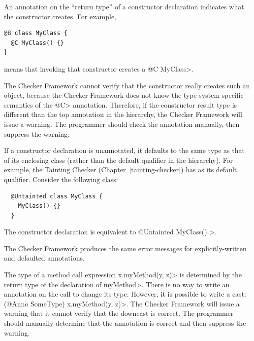 

An annotation on the ``return type'' of a constructor declaration indicates
what the constructor creates.  For example,

\begin{Verbatim}
@B class MyClass {
  @C MyClass() {}
}
\end{Verbatim}

\noindent
means that invoking that constructor creates a \<@C MyClass>.

The Checker Framework cannot verify that the constructor really creates
such an object, because the Checker Framework does not know the
type-system-specific semantics of the \<@C> annotation.
Therefore, if the constructor result type is different than the top annotation in the
hierarchy, the Checker Framework will issue a warning.
The programmer should check the annotation manually, then
suppress the warning.



If a constructor declaration is unannotated, it defaults to the same type as that of
its enclosing class (rather than the default qualifier in the hierarchy).
For example, the Tainting Checker (Chapter~\ref{tainting-checker}) has 
as its default qualifier. Consider the following class:

\begin{Verbatim}
  @Untainted class MyClass {
    MyClass() {}
  }
\end{Verbatim}

\noindent
The constructor declaration is equivalent to \<@Untainted MyClass() \ttlcb\ttrcb>.

The Checker Framework produces the same error messages for
explicitly-written and defaulted annotations.



The type of a method call expression \<x.myMethod(y, z)> is determined by
the return type of the declaration of \<myMethod>.  There is no way to
write an annotation on the call to change its type.  However, it is
possible to write a cast:  \<(@Anno SomeType) x.myMethod(y, z)>.  The Checker
Framework will issue a warning that it cannot verify that the downcast is
correct.  The programmer should manually determine that the annotation is
correct and then suppress the warning.

